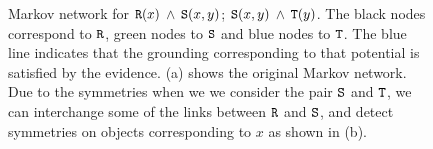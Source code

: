 \begin{figure}
\caption{\label{fig:ex3}Markov network for ${\tt R}(x)$ $\wedge$ ${\tt S}(x,y)$; ${\tt S}(x,y)$ $\wedge$ ${\tt T}(y)$. The black nodes correspond to ${\tt R}$, green nodes to ${\tt S}$ and blue nodes to ${\tt T}$. The blue line indicates that the grounding corresponding to that potential is satisfied by the evidence. (a) shows the original Markov network. Due to the symmetries when we we consider the pair ${\tt S}$ and ${\tt T}$, we can interchange some of the links between ${\tt R}$ and ${\tt S}$, and detect symmetries on objects corresponding to $x$ as shown in (b).}
\end{figure}
